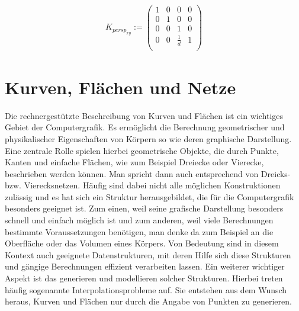 \documentclass[]{article}
\begin{document}
\begin{align*}
K_{persp_{xy}} := \begin{pmatrix}  
1   &  0 & 0 & 0  \\
0   &  1 & 0 & 0  \\
0   &  0 & 1 & 0  \\
0   &  0 & \frac{1}{d} & 1  \\
\end{pmatrix} 
\end{align*}

\section{Kurven, Flächen und  Netze}
Die rechnergestützte Beschreibung von Kurven und Flächen ist ein wichtiges Gebiet der Computergrafik.
Es ermöglicht die Berechnung geometrischer und physikalischer  Eigenschaften von Körpern so wie deren graphische Darstellung.
Eine zentrale Rolle spielen hierbei geometrische Objekte, die durch Punkte, Kanten und einfache Flächen, wie zum Beispiel Dreiecke oder Vierecke, beschrieben werden können. Man spricht dann auch entsprechend von Dreicks- bzw. Vierecksnetzen. Häufig sind dabei nicht alle möglichen Konstruktionen zulässig und es hat sich ein Struktur herausgebildet, die für die Computergrafik besonders geeignet ist. Zum einen, weil seine grafische Darstellung besonders schnell und einfach möglich ist und zum anderen, weil viele Berechnungen bestimmte Voraussetzungen benötigen, man denke da zum Beispiel an die Oberfläche oder das Volumen eines Körpers.
Von Bedeutung sind in diesem Kontext auch geeignete Datenstrukturen, mit deren Hilfe sich diese Strukturen und gängige Berechnungen effizient verarbeiten lassen. 
Ein weiterer wichtiger Aspekt ist das generieren und modellieren solcher Strukturen. Hierbei treten häufig sogenannte Interpolationsprobleme auf. Sie entstehen aus dem Wunsch heraus, Kurven und Flächen nur durch die Angabe von Punkten zu generieren. 
\end{document}
